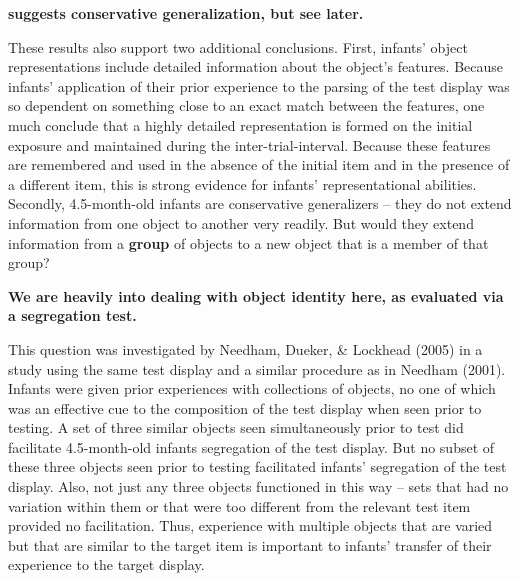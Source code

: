 {
\bf suggests conservative generalization, but see later.
}

These results also support two additional conclusions.  First,
infants' object representations include detailed information
about the object's features.  Because infants'
application of their prior experience to the parsing of the test
display was so dependent on something close to an exact match between
the features, one much conclude that a highly detailed representation
is formed on the initial exposure and maintained during the
inter-trial-interval.  Because these features are remembered and used
in the absence of the initial item and in the presence of a different
item, this is strong evidence for infants' representational
abilities.  Secondly, 4.5-month-old infants are conservative
generalizers -- they do not extend information from one object to
another very readily.  But would they extend information from a {\bf group}
of objects to a new object that is a member of that group?

{
\bf We are heavily into dealing with object identity here,
as evaluated via a segregation test.
}

This question was investigated by Needham, Dueker, \& Lockhead (2005)
in a study using the same test display and a similar procedure as in
Needham (2001).  Infants were given prior experiences with collections
of objects, no one of which was an effective cue to the composition of
the test display when seen prior to testing.  A set of three similar
objects seen simultaneously prior to test did facilitate 4.5-month-old
infants segregation of the test display.  But no subset of these three
objects seen prior to testing facilitated infants' segregation
of the test display.  Also, not just any three objects functioned in
this way -- sets that had no variation within them or that were
too different from the relevant test item provided no facilitation.
Thus, experience with multiple objects that are varied but that are
similar to the target item is important to infants' transfer
of their experience to the target display.



